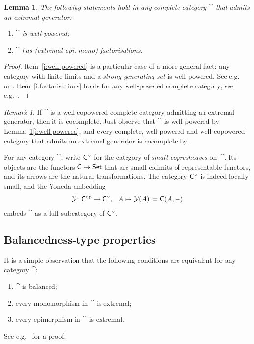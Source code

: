 \documentclass[a4paper,10pt,reqno]{amsart}
\newtheorem{lemma}[theorem]{Lemma}
\theoremstyle{definition}
\theoremstyle{remark}
\newtheorem{remark}[theorem]{Remark}
\begin{document}
\begin{lemma}\label{l:basic-props-complete-gen}
The following statements hold in any complete category $\cat$ that admits an extremal generator:
\begin{enumerate}[label=(\roman*)]
\item\label{i:well-powered} $\cat$ is well-powered;
\item\label{i:factorisations} $\cat$ has (extremal epi, mono) factorisations.
\end{enumerate}
\end{lemma}
%
\begin{proof}
Item~\ref{i:well-powered} is a particular case of a more general fact: any category with finite limits and a \emph{strong generating set} is well-powered. See e.g.\ \cite[\S A1.4, Remark~1.4.17]{Elephant1} or \cite[Proposition~4.5.15]{Borceux1}.
%
Item~\ref{i:factorisations} holds for any well-powered complete category; see e.g.\ \cite[Propositions~4.3.7, 4.4.2 and~4.4.3]{Borceux1}.
\end{proof}

\begin{remark}\label{r:cocompleteness-from-gen}
If $\cat$ is a well-copowered complete category admitting an extremal generator, then it is cocomplete. Just observe that $\cat$ is well-powered by Lemma~\ref{l:basic-props-complete-gen}\ref{i:well-powered}, and every complete, well-powered and well-copowered category that admits an extremal generator is cocomplete by \cite[Exercise~12H]{ahs06book}.
\end{remark}

For any category $\cat$, write ${{\sf C}}^{\text{\tiny$\vee$}}$ for the category of \emph{small copresheaves} on~$\cat$. Its objects are the functors ${\sf C}\to {\sf Set}$ that are small colimits of representable functors, and its arrows are the natural transformations. The category ${{\sf C}}^{\text{\tiny$\vee$}}$ is indeed locally small, and the Yoneda embedding
\[
\mathcal{Y}\colon {\sf C}^{{\mathrm{op}}}\to {{\sf C}}^{\text{\tiny$\vee$}}, \ \ A\mapsto \mathcal{Y}(A)\coloneqq {\sf C}(A,-)
\]
embeds $\cat$ as a full subcategory of ${{\sf C}}^{\text{\tiny$\vee$}}$.


\subsection{Balancedness-type properties}\label{s:definability-props}
%
It is a simple observation that the following conditions are equivalent for any category $\cat$:
\begin{enumerate}[label=(\arabic*)]
\item $\cat$ is balanced;
\item every monomorphism in $\cat$ is extremal;
\item\label{i:every-epi-is-extremal} every epimorphism in $\cat$ is extremal.
\end{enumerate}
See e.g.\ \cite[Proposition~7.67]{ahs06book} for a proof.
\end{document}
